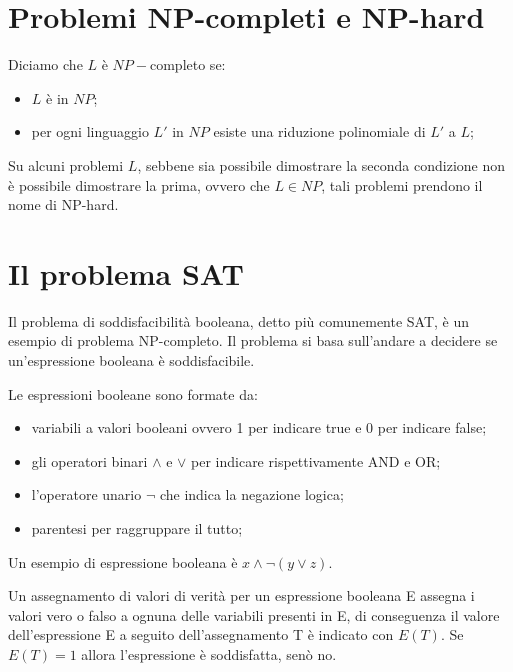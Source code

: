 \section{Problemi NP-completi e NP-hard}
\begin{definition}
    Diciamo che $L$ è $NP-$completo se:
    \begin{itemize}
        \item $L$ è in $NP$;
        \item per ogni linguaggio $L'$ in $NP$ esiste una riduzione polinomiale di $L'$ a $L$;
    \end{itemize}
\end{definition}

Su alcuni problemi $L$, sebbene sia possibile dimostrare la seconda condizione non è possibile dimostrare la prima, ovvero che $L\in NP$, tali problemi prendono il nome di NP-hard. 

\section{Il problema SAT}
Il problema di soddisfacibilità booleana, detto più comunemente SAT, è un esempio di problema NP-completo. 
\hfill \break
Il problema si basa sull'andare a decidere se un'espressione booleana è soddisfacibile. 

\hfill \break 
Le espressioni booleane sono formate da: 
\begin{itemize}
    \item variabili a valori booleani ovvero 1 per indicare true e 0 per indicare false; 
    \item gli operatori binari $\land$ e $\lor$ per indicare rispettivamente AND e OR;
    \item l'operatore unario $\lnot$ che indica la negazione logica; 
    \item parentesi per raggruppare il tutto; 
\end{itemize}

\begin{example}
    Un esempio di espressione booleana è $x \land \lnot(y \lor z)$.
\end{example}

\begin{definition}
    Un assegnamento di valori di verità per un espressione booleana E assegna i valori vero o falso a ognuna delle variabili presenti in E, di conseguenza il valore dell'espressione E a seguito dell'assegnamento T è indicato con $E(T)$.
    Se $E(T)=1$ allora l'espressione è soddisfatta, senò no.
\end{definition}

